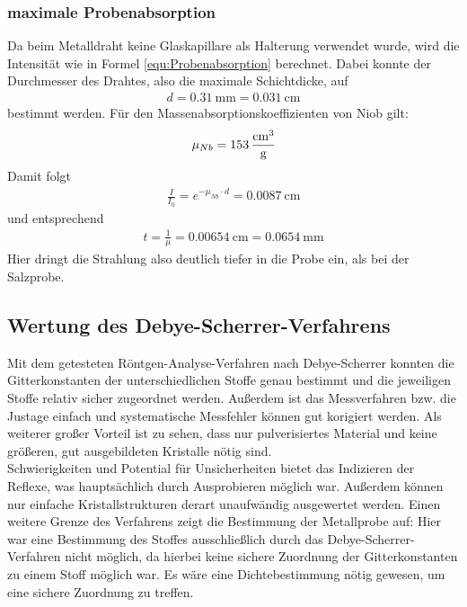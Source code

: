 \documentclass[a4paper,twoside,final]{article}
\begin{document}
\subsubsection{maximale Probenabsorption}
Da beim Metalldraht keine Glaskapillare als Halterung verwendet wurde, wird die Intensität wie in Formel \ref{equ:Probenabsorption} berechnet. Dabei konnte der Durchmesser des Drahtes, also die maximale Schichtdicke, auf
\begin{align}
  d = \SI{0,31}{\milli\meter}=\SI{0,031}{\centi\meter}
\end{align}
bestimmt werden. Für den Massenabsorptionskoeffizienten von Niob gilt:
\begin{align}
  \mu_{Nb}= \SI{153}{\frac{\centi\meter\cubed}{\gram}}
\end{align}
Damit folgt
\begin{align}
  \frac{I}{I_0}=e^{-\mu_{Nb}\cdot d} = \SI{0,0087}{\centi\meter}
\end{align}
und entsprechend
\begin{align}
  t = \frac{1}{\mu} = \SI{0,00654}{\centi\meter} =  \SI{0,0654}{\milli\meter}
\end{align}
Hier dringt die Strahlung also deutlich tiefer in die Probe ein, als bei der Salzprobe.

\subsection{Wertung des Debye-Scherrer-Verfahrens}
Mit dem getesteten Röntgen-Analyse-Verfahren nach Debye-Scherrer konnten die Gitterkonstanten der unterschiedlichen Stoffe genau bestimmt und die jeweiligen Stoffe relativ sicher zugeordnet werden. Außerdem ist das Messverfahren bzw. die Justage einfach und systematische Messfehler können gut korigiert werden. Als weiterer großer Vorteil ist zu sehen, dass nur pulverisiertes Material und keine größeren, gut ausgebildeten Kristalle nötig sind.\\
Schwierigkeiten und Potential für Unsicherheiten bietet das Indizieren der Reflexe, was hauptsächlich durch Ausprobieren möglich war. Außerdem können nur einfache Kristallstrukturen derart unaufwändig ausgewertet werden. Einen weitere Grenze des Verfahrens zeigt die Bestimmung der Metallprobe auf: Hier war eine Bestimmung des Stoffes ausschließlich durch das Debye-Scherrer-Verfahren nicht möglich, da hierbei keine sichere Zuordnung der Gitterkonstanten zu einem Stoff möglich war. Es wäre eine Dichtebestimmung nötig gewesen, um eine sichere Zuordnung zu treffen.
\end{document}
